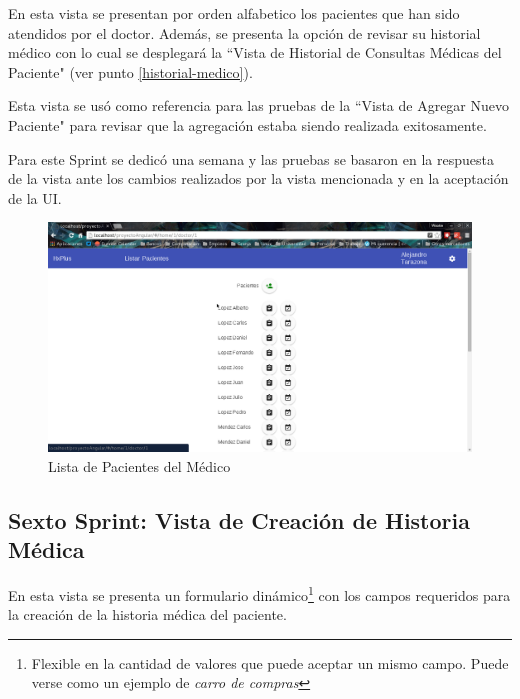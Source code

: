     En esta vista se presentan por orden alfabetico los pacientes que han sido atendidos por el doctor. Además, se presenta la opción de revisar su historial médico con lo cual se desplegará la ``Vista de Historial de Consultas Médicas del Paciente" (ver punto \ref{historial-medico}).
    
    Esta vista se usó como referencia para las pruebas de la ``Vista de Agregar Nuevo Paciente" para revisar que la agregación estaba siendo realizada exitosamente.
    
    Para este Sprint se dedicó una semana y las pruebas se basaron en la respuesta de la vista ante los cambios realizados por la vista mencionada y en la aceptación de la UI.
    
    \begin{figure}[htbp!]
        \begin{center}
            \includegraphics[width=.9\textwidth]{figures/p6}
        \end{center}
        \caption{\label{Pacientes}Lista de Pacientes del Médico}
    \end{figure}
    
    \subsection{Sexto Sprint: Vista de Creación de Historia Médica}
    
    En esta vista se presenta un formulario dinámico\footnote{Flexible en la cantidad de valores que puede aceptar un mismo campo. Puede verse como un ejemplo de \textit{carro de compras}} con los campos requeridos para la creación de la historia médica del paciente.
    
